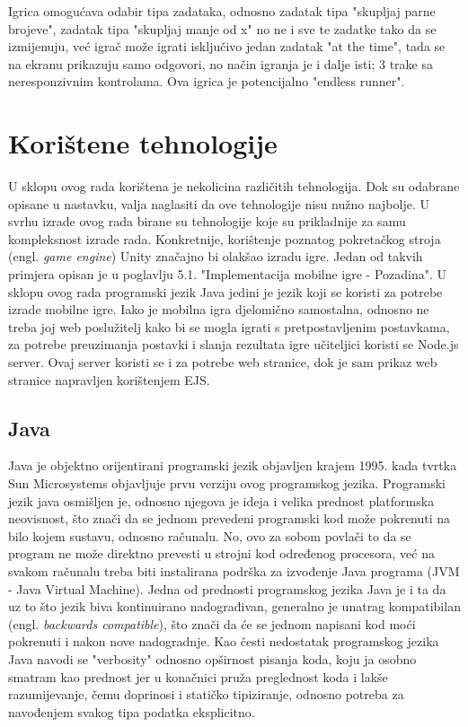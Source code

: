 \documentclass[times, utf8, zavrsni, numeric]{fer}
\begin{document}
Igrica omogućava odabir tipa zadataka, odnosno zadatak tipa "skupljaj parne brojeve", zadatak tipa "skupljaj manje od x" no ne i sve te zadatke tako da se izmijenuju, već igrač može igrati isključivo jedan zadatak "at the time", tada se na ekranu 
prikazuju samo odgovori, no način igranja je i dalje isti; 3 trake sa neresponzivnim kontrolama. Ova igrica je potencijalno "endless runner". 

\chapter{Korištene tehnologije}
U sklopu ovog rada korištena je nekolicina različitih tehnologija. Dok su odabrane opisane u nastavku, valja naglasiti da ove tehnologije nisu nužno najbolje. U svrhu izrade ovog rada birane su tehnologije koje su prikladnije za samu kompleksnost izrade rada.
Konkretnije, korištenje poznatog pokretačkog stroja (engl. \textit{game engine}) Unity značajno bi olakšao izradu igre. Jedan od takvih primjera opisan je u poglavlju 5.1. "Implementacija mobilne igre - Pozadina". 
U sklopu ovog rada programski jezik Java jedini je jezik koji se koristi za potrebe izrade mobilne igre. Iako je mobilna igra djelomično samostalna, odnosno ne treba joj web poslužitelj kako bi se mogla igrati s pretpostavljenim postavkama, za potrebe 
preuzimanja postavki i slanja rezultata igre učiteljici koristi se Node.js server. Ovaj server koristi se i za potrebe web stranice, dok je sam prikaz web stranice napravljen korištenjem EJS.


	\section{Java}
	Java je objektno orijentirani programski jezik objavljen krajem 1995. kada tvrtka Sun Microsystems objavljuje prvu verziju ovog programskog jezika. Programski jezik java osmišljen je, odnosno njegova je ideja i velika prednost platformska neovisnost,
	što znači da se jednom prevedeni programski kod može pokrenuti na bilo kojem sustavu, odnosno računalu. No, ovo za sobom povlači to da se program ne može direktno prevesti u strojni kod određenog procesora, već na svakom računalu treba biti
	instalirana podrška za izvođenje Java programa (JVM - Java Virtual Machine)\cite{mcjava}. 
	Jedna od prednosti programskog jezika Java je i ta da uz to što jezik biva kontinuirano nadograđivan, generalno je unatrag kompatibilan (engl. \textit{backwards compatible}), što znači da će se jednom napisani kod moći pokrenuti i nakon nove nadogradnje.
	Kao česti nedostatak programskog jezika Java navodi se "verbosity" odnosno opširnost pisanja koda, koju ja osobno smatram kao prednost jer u konačnici pruža preglednost koda i lakše razumijevanje, čemu doprinosi i statičko tipiziranje, odnosno 
	potreba za navođenjem svakog tipa podatka eksplicitno. 
	
\end{document}

